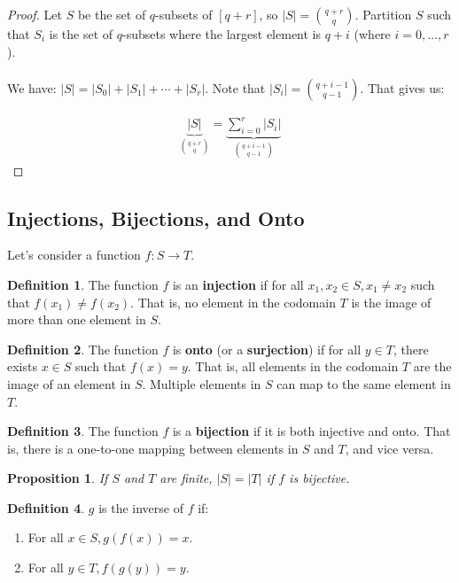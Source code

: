 \documentclass[]{article}
\newtheorem*{proposition}{Proposition}
\theoremstyle{definition}
\newtheorem*{defn}{Definition}
\newcommand{\lecture}[1]{\marginpar{{\footnotesize $\leftarrow$ \underline{#1}}}}
\begin{document}
				\begin{proof}
					Let $S$ be the set of $q$-subsets of $[q + r]$, so $|S| = \binom{q + r}{q}$. Partition $S$ such that $S_i$ is the set of $q$-subsets where the largest element is $q + i$ (where $i = 0, \ldots, r$).
					\\ \\
					We have: $|S| = |S_0| + |S_1| + \cdots + |S_r|$. Note that $|S_i| = \binom{q + i - 1}{q - 1}$. That gives us:
					
					\begin{align*}
						\underbrace{|S|}_{\binom{q + r}{q}} = \underbrace{\sum_{i = 0}^{r} |S_i|}_{\binom{q + i - 1}{q - 1}}
					\end{align*}
				\end{proof}
		
		\subsection{Injections, Bijections, and Onto} \lecture{January 11, 2013}
			Let's consider a function $f: S \to T$.
			\begin{defn}
				The function $f$ is an \textbf{injection} if for all $x_1, x_2 \in S, x_1 \ne x_2$ such that $f(x_1) \ne f(x_2)$. That is, no element in the codomain $T$ is the image of more than one element in $S$.
			\end{defn}

			\begin{defn}
				The function $f$ is \textbf{onto} (or a \textbf{surjection}) if for all $y \in T$, there exists $x \in S$ such that $f(x) = y$. That is, all elements in the codomain $T$ are the image of an element in $S$. Multiple elements in $S$ can map to the same element in $T$.
			\end{defn}

			\begin{defn}
				The function $f$ is a \textbf{bijection} if it is both injective and onto. That is, there is a one-to-one mapping between elements in $S$ and $T$, and vice versa.
			\end{defn}

			\begin{proposition}
				If $S$ and $T$ are finite, $|S| = |T|$ if $f$ is bijective.
			\end{proposition}
			
			\begin{defn}
				$g$ is the inverse of $f$ if:
				\begin{enumerate}
					\item For all $x \in S, g(f(x)) = x$.
					\item For all $y \in T, f(g(y)) = y$.
				\end{enumerate}
			\end{defn}
			
\end{document}
